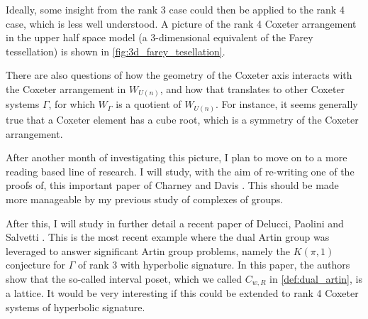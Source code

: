 Ideally, some insight from the rank 3 case could then be applied to the rank 4 case, which is less well understood.
A picture of the rank 4 Coxeter arrangement in the upper half space model (a 3-dimensional equivalent of the Farey tessellation) is shown in \cref{fig:3d_farey_tesellation}.

There are also questions of how the geometry of the Coxeter axis interacts with the Coxeter arrangement in $W_{U(n)}$, and how that translates to other Coxeter systems  $\Gamma$, for which  $W_\Gamma$ is a quotient of  $W_{U(n)}$.
For instance, it seems generally true that a Coxeter element has a cube root, which is a symmetry of the Coxeter arrangement.

After another month of investigating this picture, I plan to move on to a more reading based line of research.
I will study, with the aim of re-writing one of the proofs of, this important paper of Charney and Davis \cite{charney_davis_kpi_1995}.
This should be made more manageable by my previous study of complexes of groups.

After this, I will study in further detail a recent paper of Delucci, Paolini and Salvetti \cite{delucchi_etal_dual_2024}.
This is the most recent example where the dual Artin group was leveraged to answer significant Artin group problems, namely the $K(\pi,1)$ conjecture for $\Gamma$ of rank 3 with hyperbolic signature.
In this paper, the authors show that the so-called interval poset, which we called $C_{w,R}$ in \cref{def:dual_artin}, is a lattice.
It would be very interesting if this could be extended to rank 4 Coxeter systems of hyperbolic signature.
